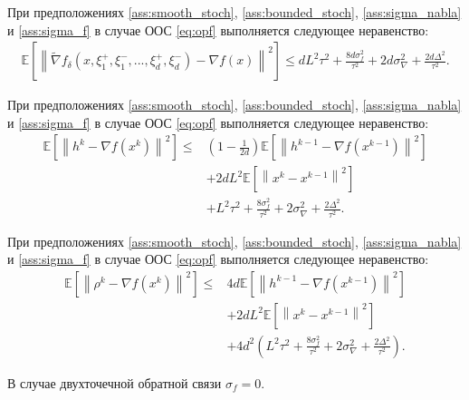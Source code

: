     \begin{lemma} \label{lemma:tilde_vs_notilda}
    
        При предположениях \ref{ass:smooth_stoch}, \ref{ass:bounded_stoch}, \ref{ass:sigma_nabla} и \ref{ass:sigma_f} в случае ООС \eqref{eq:opf} выполняется следующее неравенство:
        \begin{align*}
            \mathbb{E} \left[ \left\| \widetilde{\nabla}f_{\delta}(x, \xi^+_1, \xi^-_1, ... , \xi_d^+, \xi_d^-) - \nabla f(x) \right\|^2 \right] \leq d L^2 \tau^2 + \frac{8 d \sigma_f^2}{\tau^2} + 2 d \sigma_{\nabla}^2 + \frac{2 d \Delta^2}{\tau^2}.
        \end{align*}
        
    \end{lemma}

    \begin{lemma} \label{lemma:h_vs_nablaf}
    
        При предположениях \ref{ass:smooth_stoch}, \ref{ass:bounded_stoch}, \ref{ass:sigma_nabla} и \ref{ass:sigma_f} в случае ООС \eqref{eq:opf} выполняется следующее неравенство:
        \begin{align*}
            \mathbb{E} \left[ \left\| h^k - \nabla f(x^k) \right\|^2 \right]
            \leq &
            \left( 1 - \frac{1}{2 d} \right) \mathbb{E} \left[ \left\| h^{k - 1} - \nabla f(x^{k - 1}) \right\|^2 \right] \\
            &+
            2d L^2 \mathbb{E} \left[ \left\| x^k - x^{k - 1} \right\|^2 \right] \\
            &+
            L^2 \tau^2 + \frac{8 \sigma_f^2}{\tau^2} + 2 \sigma_{\nabla}^2 + \frac{2 \Delta^2}{\tau^2}.
        \end{align*}
        
    \end{lemma}

    \begin{lemma} \label{lemma:rho_vs_nablaf}
    
        При предположениях \ref{ass:smooth_stoch}, \ref{ass:bounded_stoch}, \ref{ass:sigma_nabla} и \ref{ass:sigma_f} в случае ООС \eqref{eq:opf} выполняется следующее неравенство:
        \begin{align*}
            \mathbb{E} \left[ \left\| \rho^k - \nabla f(x^k) \right\|^2 \right]
            \leq &
            4d \mathbb{E} \left[ \left\| h^{k - 1} - \nabla f(x^{k - 1}) \right\|^2 \right] \\
            &+
            2d L^2 \mathbb{E} \left[ \left\|x^k - x^{k - 1} \right\|^2 \right] \\
            &+
            4d^2 \left( L^2 \tau^2 + \frac{8 \sigma_f^2}{\tau^2} + 2 \sigma_{\nabla}^2 + \frac{2 \Delta^2}{\tau^2} \right).
        \end{align*}
        
        В случае двухточечной обратной связи $\sigma_f = 0$.
        
    \end{lemma}

